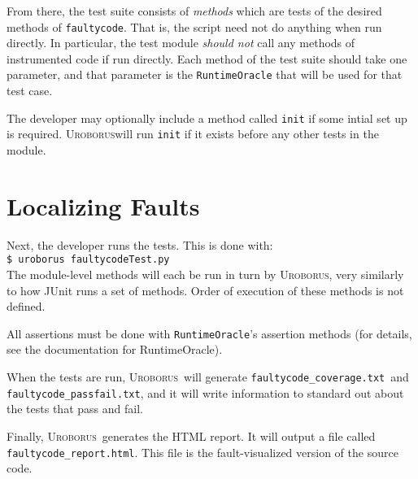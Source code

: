 \documentclass[english]{article}
\newcommand{\Uro}{\textsc{Uroborus}}
\newcommand{\fc}{\texttt{faultycode}}
\newcommand{\fcT}{\texttt{faultycodeTest.py}}
\newcommand{\fcc}{\texttt{faultycode\_coverage.txt}}
\newcommand{\fcpf}{\texttt{faultycode\_passfail.txt}}
\newcommand{\fch}{\texttt{faultycode\_report.html}}
\begin{document}
From there, the test suite consists of \emph{methods} which are tests of the desired methods of \fc. 
That is, the script need not do anything when run directly. In particular, the test module \emph{should
not} call any methods of instrumented code if run directly. 
Each method of the test suite should take one parameter, and that parameter is the
\texttt{RuntimeOracle} that will be used for that test case.

The developer may optionally include a method called \texttt{init} if some intial set up is
required. \Uro will run \texttt{init} if it exists before any other tests in the module.


\section{Localizing Faults}

Next, the developer runs the tests. This is done with:\\

\texttt{\$ uroborus }\fcT \\

The module-level methods will each be
run in turn by \Uro, very similarly to how JUnit runs a set of methods. Order of execution of these
methods is not defined.

All assertions must be
done with \texttt{RuntimeOracle}'s assertion methods (for details, see the documentation for RuntimeOracle).

When the tests are run, \Uro\
will generate \fcc\ and \fcpf, and it will write information to standard out about the tests that
pass and fail. 

Finally, \Uro\ generates the HTML report. It will output a file called \fch. This file is
the fault-visualized version of the source code.




\end{document}
